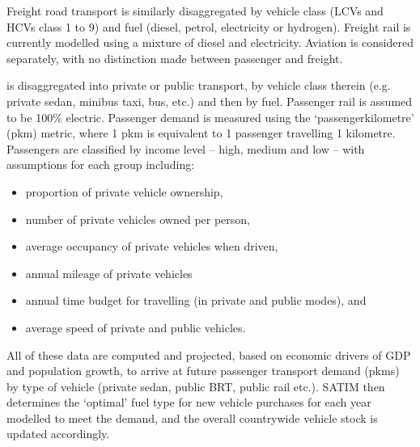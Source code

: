 \documentclass[letterpaper,10pt,english]{jupyterBook}
\begin{document}
\sphinxAtStartPar
Freight road transport is similarly disaggregated by vehicle class (LCVs and HCVs class 1 to 9) and fuel (diesel, petrol, electricity or hydrogen). Freight rail is currently modelled using a mixture of diesel and electricity. Aviation is considered separately, with no distinction made between passenger and freight.

\sphinxAtStartPar
{}

\sphinxAtStartPar
{} is disaggregated into private or public transport, by vehicle class therein (e.g. private sedan, minibus taxi, bus, etc.) and then by fuel. Passenger rail is assumed to be 100\% electric. Passenger demand is measured using the ‘passenger\sphinxhyphen{}kilometre’ (pkm) metric, where 1 pkm is equivalent to 1 passenger travelling 1 kilometre. Passengers are classified by income level – high, medium and low – with assumptions for each group including:
\begin{itemize}
\item {} 
\sphinxAtStartPar
proportion of private vehicle ownership,

\item {} 
\sphinxAtStartPar
number of private vehicles owned per person,

\item {} 
\sphinxAtStartPar
average occupancy of private vehicles when driven,

\item {} 
\sphinxAtStartPar
annual mileage of private vehicles

\item {} 
\sphinxAtStartPar
annual time budget for travelling (in private and public modes), and

\item {} 
\sphinxAtStartPar
average speed of private and public vehicles.

\end{itemize}

\sphinxAtStartPar
All of these data are computed and projected, based on economic drivers of GDP and population growth, to arrive at future passenger transport demand (pkms) by type of vehicle (private sedan, public BRT, public rail etc.). SATIM then determines the ‘optimal’ fuel type for new vehicle purchases for each year modelled to meet the demand, and the overall country\sphinxhyphen{}wide vehicle stock is updated accordingly.
\end{document}

